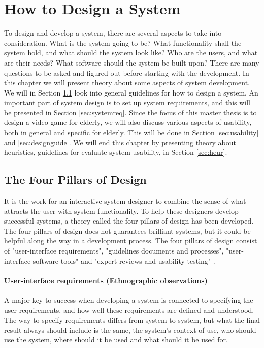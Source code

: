 \chapter{How to Design a System}
To design and develop a system, there are several aspects to take into consideration. What is the system going to be? What functionality shall the system hold, and what should the system look like? Who are the users, and what are their needs? What software should the system be built upon? There are many questions to be asked and figured out before starting with the development. In this chapter we will present theory about some aspects of system development. We will in Section \ref{sec:fourpillarsofdesign} look into general guidelines for how to design a system. An important part of system design is to set up system requirements, and this will be presented in Section \ref{sec:systemreq}. Since the focus of this master thesis is to design a video game for elderly, we will also discuss various aspects of usability, both in general and specific for elderly. This will be done in Section \ref{sec:usability} and \ref{sec:designguide}. We will end this chapter by presenting theory about heuristics, guidelines for evaluate system usability, in Section \ref{sec:heur}.   

\section{The Four Pillars of Design}
\label{sec:fourpillarsofdesign}
It is the work for an interactive system designer to combine the sense of what attracts the user with system functionality. To help these designers develop successful systems, a theory called the four pillars of design has been developed. The four pillars of design does not guarantees brilliant systems, but it could be helpful along the way in a development process. The four pillars of design consist of "user-interface requirements", "guidelines documents and processes", "user-interface software tools" and "expert reviews and usability testing" \cite{mmi}.    

\subsubsection{User-interface requirements (Ethnographic observations)}   
A major key to success when developing a system is connected to specifying the user requirements, and how well these requirements are defined and understood. The way to specify requirements differs from system to system, but what the final result always should include is the same, the system's context of use, who should use the system, where should it be used and what should it be used for. 

